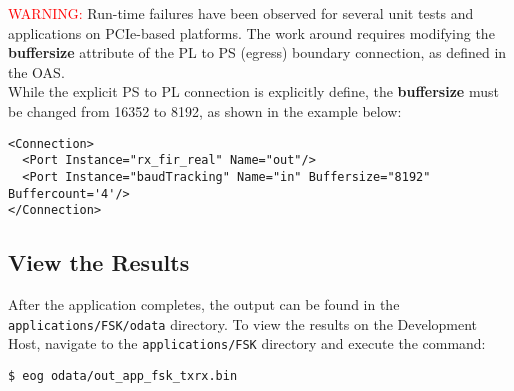 \begin{flushleft}
\noindent\textcolor{red}{WARNING:}
Run-time failures have been observed for several unit tests and applications on PCIe-based platforms. The work around requires modifying the \textbf{buffersize} attribute of the PL to PS (egress) boundary connection, as defined in the OAS. \\
While the explicit PS to PL connection is explicitly define, the \textbf{buffersize} must be changed from 16352 to 8192, as shown in the example below:
\begin{lstlisting}[showspaces=false]
<Connection>
  <Port Instance="rx_fir_real" Name="out"/>
  <Port Instance="baudTracking" Name="in" Buffersize="8192" Buffercount='4'/>
</Connection>
\end{lstlisting}

\subsection{View the Results}
After the application completes, the output can be found in the \texttt{applications/FSK/odata} directory. To view the results on the Development Host, navigate to the \texttt{applications/FSK} directory and execute the command:
\begin{verbatim}
$ eog odata/out_app_fsk_txrx.bin
\end{verbatim}
\end{flushleft}

